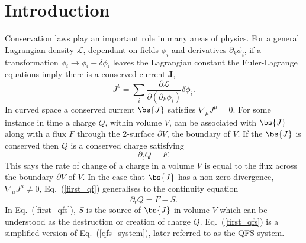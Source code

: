 \section{Introduction} \label{sect:intro}


Conservation laws play an important role in many areas of physics. For a general Lagrangian density $\mathcal{L}$, dependant on fields $\phi_i$ and derivatives $\partial_k \phi_i$, if a transformation $\phi_i \rightarrow \phi_i + \delta \phi_i$ leaves the Lagrangian constant the Euler-Lagrange equations imply there is a conserved current $\boldsymbol{J}$,
\begin{equation}
J^k = \sum_i \frac{\partial \mathcal{L}}{\partial (\partial_k \phi_i)}\delta \phi_i.
\end{equation}
In curved space a conserved current $\bs{J}$ satisfies $\nabla_\mu J^\mu = 0$. For some instance in time a charge $Q$, within volume $V$, can be associated with $\bs{J}$ along with a flux ${F}$ through the 2-surface $\partial V$, the boundary of $V$. If the $\bs{J}$ is conserved then $Q$ is a conserved charge satisfying
\begin{equation}
\label{first_qf}\partial_t Q = {F}.
\end{equation}
This says the rate of change of a charge in a volume $V$ is equal to the flux across the boundary $\partial V$ of $V$. In the case that $\bs{J}$ has a non-zero divergence, $\nabla_\mu J^\mu \neq 0$, Eq.~(\ref{first_qf}) generalises to the continuity equation
\begin{equation}
\label{first_qfs}\partial_t {Q} = {F} - {S}.
\end{equation}
In Eq.~(\ref{first_qfs}), ${S}$ is the source of $\bs{J}$ in volume $V$ which can be understood as the destruction or creation of charge $Q$. Eq.~(\ref{first_qfs}) is a simplified version of Eq.~(\ref{qfs_system}), later referred to as the QFS system.



